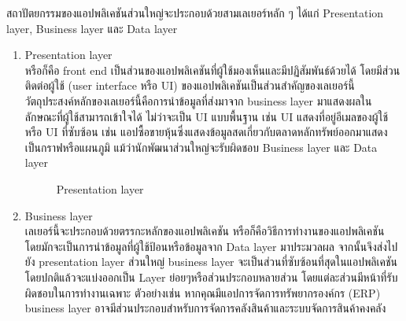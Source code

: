 \documentclass[14pt,oneside,openright,a4paper]{cpe-thai-project}
\begin{document}
สถาปัตยกรรมของแอปพลิเคชันส่วนใหญ่จะประกอบด้วยสามเลเยอร์หลัก ๆ ได้แก่ Presentation layer, Business layer และ Data layer
  \begin{enumerate} 
    \item Presentation layer\cite{MobileAppArchitecture} \\
          หรือก็คือ front end เป็นส่วนของแอปพลิเคชันที่ผู้ใช้มองเห็นและมีปฏิสัมพันธ์ด้วยได้ โดยมีส่วนติดต่อผู้ใช้ (user interface หรือ UI) ของแอปพลิเคชันเป็นส่วนสำคัญของเลเยอร์นี้
          วัตถุประสงค์หลักของเลเยอร์นี้คือการนำข้อมูลที่ส่งมาจาก business layer มาแสดงผลในลักษณะที่ผู้ใช้สามารถเข้าใจได้
          ไม่ว่าจะเป็น UI แบบพื้นฐาน เช่น UI แสดงที่อยู่อีเมลของผู้ใช้หรือ UI ที่ซับซ้อน เช่น แอปซื้อขายหุ้นซึ่งแสดงข้อมูลสดเกี่ยวกับตลาดหลักทรัพย์ออกมาแสดงเป็นกราฟหรือแผนภูมิ แม้ว่านักพัฒนาส่วนใหญ่จะรับผิดชอบ Business layer และ Data layer

      \begin{figure}[!h]\centering
        \setlength{\fboxrule}{0.5mm} %
        \setlength{\fboxsep}{0.5cm}
        \caption{Presentation layer \cite{PresentationLayer}}\label{fig:mobile_arc2}
      \end{figure}

\newpage

    \item Business layer \cite{MobileAppArchitecture} \\
          เลเยอร์นี้จะประกอบด้วยตรรกะหลักของแอปพลิเคชัน หรือก็คือวิธีการทำงานของแอปพลิเคชัน โดยมักจะเป็นการนำข้อมูลที่ผู้ใช้ป้อนหรือข้อมูลจาก Data layer มาประมวลผล จากนั้นจึงส่งไปยัง presentation layer
          ส่วนใหญ่ business layer จะเป็นส่วนที่ซับซ้อนที่สุดในแอปพลิเคชัน 
          โดยปกติแล้วจะแบ่งออกเป็น Layer ย่อยๆหรือส่วนประกอบหลายส่วน โดยแต่ละส่วนมีหน้าที่รับผิดชอบในการทำงานเฉพาะ
          ตัวอย่างเช่น หากคุณมีแอปการจัดการทรัพยากรองค์กร (ERP) business layer อาจมีส่วนประกอบสำหรับการจัดการคลังสินค้าและระบบจัดการสินค้าคงคลัง 


\end{enumerate}
\end{document}
